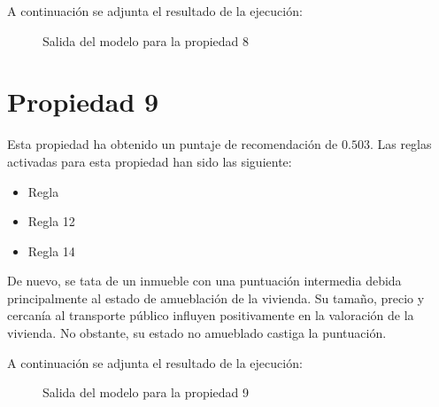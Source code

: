 \documentclass[12pt]{report} %
\begin{document}
    A continuación se adjunta el resultado de la ejecución:
    \begin{figure}[H]
        \centering
        \caption{Salida del modelo para la propiedad 8}
    \end{figure}

    \section{Propiedad 9}
    Esta propiedad ha obtenido un puntaje de recomendación de $0.503$. Las
    reglas activadas para esta propiedad han sido las siguiente:
    \begin{itemize}
        \item Regla 
        \item Regla 12
        \item Regla 14
    \end{itemize}
    
    De nuevo, se tata de un inmueble con una puntuación intermedia debida
    principalmente al estado de amueblación de la vivienda. Su tamaño, precio y
    cercanía al transporte público influyen positivamente en la valoración de
    la vivienda. No obstante, su estado no amueblado castiga la puntuación.

    A continuación se adjunta el resultado de la ejecución:
    \begin{figure}[H]
        \centering
        \caption{Salida del modelo para la propiedad 9}
    \end{figure}
\end{document}
